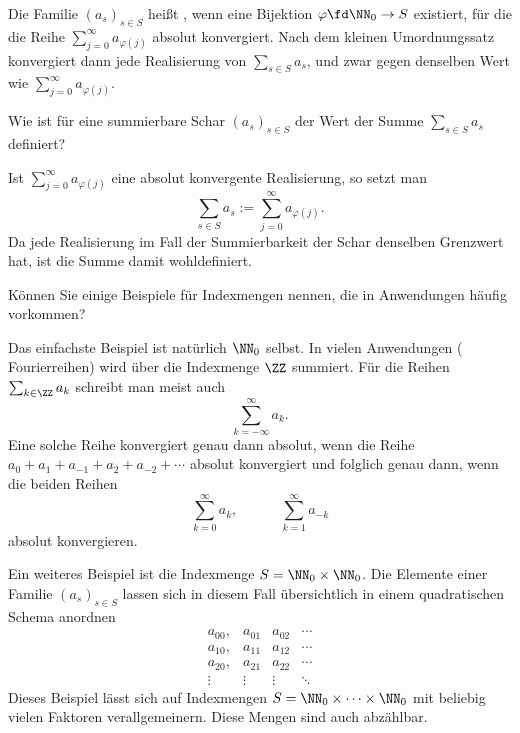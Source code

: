 \begin{antwort}
  Die Familie $(a_s)_{s\in S}$ heißt , wenn 
  eine Bijektion $\varphi\fd \NN_0 \to S$ existiert, für die die 
  Reihe $
  \sum_{j=0}^\infty a_{\varphi(j)}$ 
  absolut konvergiert. Nach dem kleinen Umordnungssatz konvergiert dann 
  jede Realisierung von $\sum_{s\in S} a_s$, und zwar gegen denselben Wert 
  wie $\sum_{j=0}^\infty a_{\varphi(j)}$. 
  \AntEnd 
  
\end{antwort} 

\begin{frage}
  Wie ist für eine summierbare Schar $(a_s)_{s\in S}$ der Wert der Summe 
  $\sum_{s\in S} a_s$ definiert?
\end{frage}

\begin{antwort}
  Ist $\sum_{j=0}^\infty a_{\varphi(j)}$ eine absolut 
  konvergente Realisierung, so setzt man 
  \[
  \sum_{s\in S} a_s:=  \sum_{j=0}^\infty a_{\varphi(j)}.
  \]
  Da jede Realisierung im Fall der Summierbarkeit der Schar denselben 
  Grenzwert hat, ist die Summe damit wohldefiniert. \AntEnd
\end{antwort} 

\begin{frage}\label{03_schema}
  Können Sie einige Beispiele für Indexmengen nennen, die in Anwendungen 
  häufig vorkommen?
\end{frage}

\begin{antwort}
  Das einfachste Beispiel ist natürlich $\NN_0$ selbst. 
  In vielen Anwendungen ({\zB} Fourierreihen) 
  wird über die Indexmenge $\ZZ$ summiert. Für die Reihen 
  $\sum_{k\in \ZZ} a_k $ schreibt man meist auch 
  \[
  \sum_{k=-\infty}^\infty a_k.
  \]
  Eine solche Reihe konvergiert genau dann absolut, wenn die 
  Reihe $a_0+a_1+a_{-1}+ a_2+a_{-2}+\cdots$ absolut konvergiert und 
  folglich genau dann, wenn die beiden Reihen 
  \[
  \sum_{k=0}^\infty a_k,\qquad\quad 
  \sum_{k=1}^\infty a_{-k}
  \]
  absolut konvergieren. 

  Ein weiteres Beispiel ist die Indexmenge 
  $S=\NN_0\times \NN_0$. Die Elemente 
  einer Familie $(a_s)_{s\in S}$  
  lassen sich in diesem Fall übersichtlich in einem 
  quadratischen Schema anordnen 
  \[
  \begin{array}{cccc} 
    a_{00}, & a_{01} & a_{02} & \cdots \\
    a_{10}, & a_{11} & a_{12} & \cdots \\
    a_{20}, & a_{21} & a_{22} & \cdots \\
    \vdots & \vdots & \vdots & \ddots 
  \end{array}
  \]
  Dieses Beispiel lässt sich auf Indexmengen 
  $S=\NN_0\times \cdots \times \NN_0$ 
  mit beliebig vielen Faktoren verallgemeinern. 
  Diese Mengen sind auch abzählbar. 
  \AntEnd
\end{antwort}

